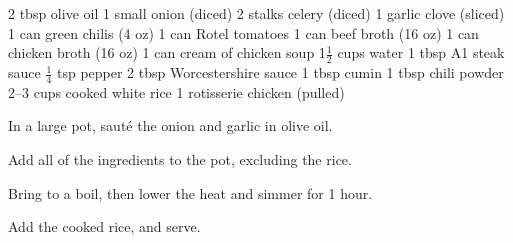 \dishtype{\soup}
\begin{ingreds}
    2 tbsp olive oil
    1 small onion (diced)
    2 stalks celery (diced)
    1 garlic clove (sliced)
    1 can green chilis (4 oz)
    1 can Rotel tomatoes
    1 can beef broth (16 oz)
    1 can chicken broth (16 oz)
    1 can cream of chicken soup
    1$\frac{1}{2}$ cups water
    1 tbsp A1 steak sauce
    $\frac{1}{4}$ tsp pepper
    2 tbsp Worcestershire sauce
    1 tbsp cumin
    1 tbsp chili powder
    2--3 cups cooked white rice 
    1 rotisserie chicken (pulled) 
\end{ingreds}
\begin{method}
    In a large pot, saut\'e the onion and garlic in olive oil.\par
    Add all of the ingredients to the pot, excluding the rice.\par
    Bring to a boil, then lower the heat and simmer for 1 hour.\par
    Add the cooked rice, and serve.
\end{method}
